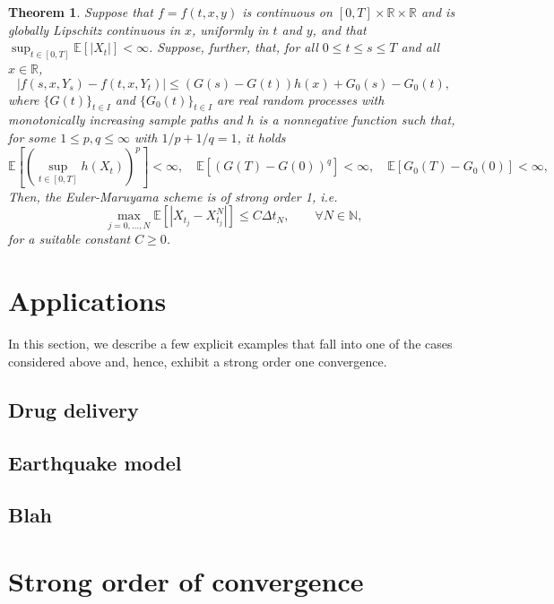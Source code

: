 \documentclass[reqno,12pt]{amsart}
\theoremstyle{plain}%
\newtheorem{thm}{Theorem}[section]
\theoremstyle{definition}
\begin{document}
\begin{thm}
    Suppose that $f=f(t, x, y)$ is continuous on $[0, T]\times \mathbb{R}\times\mathbb{R}$ and is globally Lipschitz continuous in $x$, uniformly in $t$ and $y$, and that $\sup_{t\in [0, T]}\mathbb{E}[|X_t|] < \infty$. Suppose, further, that, for all $0 \leq t \leq s \leq T$ and all $x\in \mathbb{R}$,
    \[
        |f(s, x, Y_s) - f(t, x, Y_t)| \leq (G(s) - G(t)) h(x) + G_0(s) - G_0(t),
    \]
    where $\{G(t)\}_{t\in I}$ and $\{G_0(t)\}_{t\in I}$ are real random processes with monotonically increasing sample paths and $h$ is a nonnegative function such that, for some $1\leq p, q \leq \infty$ with $1/p + 1/q = 1$, it holds
    \[
        \mathbb{E}\left[\left(\sup_{t\in [0, T]}h(X_t)\right)^p\right] < \infty, \quad \mathbb{E}[(G(T) - G(0))^q] < \infty, \quad \mathbb{E}[G_0(T) - G_0(0)] < \infty,
    \]
    Then, the Euler-Maruyama scheme is of strong order 1, i.e.
    \begin{equation}
        \max_{j=0, \ldots, N}\mathbb{E}\left[ \left| X_{t_j} - X_{t_j}^N \right| \right] \leq C \Delta t_N, \qquad \forall N \in \mathbb{N},
    \end{equation}
    for a suitable constant $C \geq 0$.
\end{thm}

\section{Applications}

In this section, we describe a few explicit examples that fall into one of the cases considered above and, hence, exhibit a strong order one convergence.

\subsection{Drug delivery}

\subsection{Earthquake model}


\subsection{Blah}

\section{Strong order of convergence}
\end{document}
